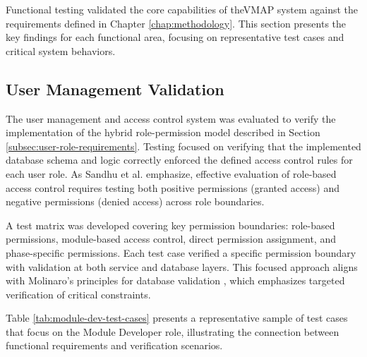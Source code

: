Functional testing validated the core capabilities of the\ac{VMAP} system against the requirements defined in Chapter \ref{chap:methodology}. This section presents the key findings for each functional area, focusing on representative test cases and critical system behaviors.

\subsection{User Management Validation}
\label{subsec:user-management-validation}

The user management and access control system was evaluated to verify the implementation of the hybrid role-permission model described in Section \ref{subsec:user-role-requirements}. Testing focused on verifying that the implemented database schema and logic correctly enforced the defined access control rules for each user role. As Sandhu et al. \cite{sandhu1998role} emphasize, effective evaluation of role-based access control requires testing both positive permissions (granted access) and negative permissions (denied access) across role boundaries.

A test matrix was developed covering key permission boundaries: role-based permissions, module-based access control, direct permission assignment, and phase-specific permissions. Each test case verified a specific permission boundary with validation at both service and database layers. This focused approach aligns with Molinaro's principles for database validation \cite{molinaro2005sql}, which emphasizes targeted verification of critical constraints.

Table \ref{tab:module-dev-test-cases} presents a representative sample of test cases that focus on the Module Developer role, illustrating the connection between functional requirements and verification scenarios.

